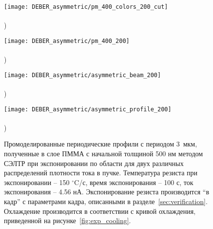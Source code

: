 \begin{figure}[t!]
	\begin{minipage}{0.48\textwidth}
		\texttt{[image: DEBER\_asymmetric/pm\_400\_colors\_200\_cut]} \\
		\vspace{-13em} \\ ) \\ \vspace{13em}
	\end{minipage}
	\begin{minipage}{0.48\textwidth}
		\texttt{[image: DEBER\_asymmetric/pm\_400\_200]} \\
		\vspace{-13em} \\ ) \\ \vspace{13em}
	\end{minipage}
	
	\vspace{-3em}
	
	\begin{minipage}{0.48\textwidth}
		\texttt{[image: DEBER\_asymmetric/asymmetric\_beam\_200]} \\
		\vspace{-13em} \\ ) \\ \vspace{13em}
	\end{minipage}
	\begin{minipage}{0.48\textwidth}
		\texttt{[image: DEBER\_asymmetric/asymmetric\_profile\_200]} \\
		\vspace{-13em} \\ ) \\ \vspace{13em}
	\end{minipage}
	\vspace{-3em}
	\caption{Промоделированные периодические профили с периодом 3~мкм, полученные в слое ПММА с начальной толщиной 500 нм методом СЭЛТР при экспонировании по области для двух различных распределений плотности тока в пучке. Температура резиста при экспонировании -- 150 $^\circ$C/с, время экспонирования -- 100 с, ток экспонирования -- 4.56 нА. Экспонирование резиста производится ``в кадр'' с параметрами кадра, описанными в разделе~\ref{sec:verification}. Охлаждение производится в соответствии с кривой охлаждения, приведенной на рисунке~\ref{fig:exp_cooling}.}
	\label{fig:DEBER_multibeam}
\end{figure}
